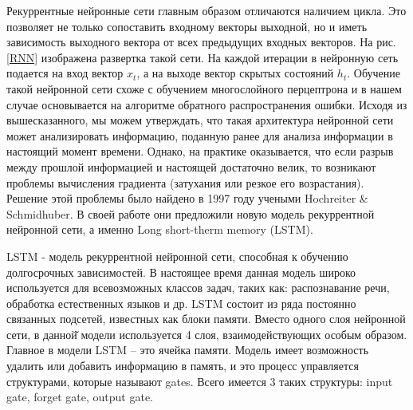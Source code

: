     Рекуррентные нейронные сети главным образом отличаются наличием цикла. Это позволяет не только сопоставить входному векторы выходной, но и иметь зависимость выходного вектора от всех предыдущих входных векторов. На рис. \ref{RNN} изображена развертка такой сети. На каждой итерации в нейронную сеть подается на вход вектор $x_{t}$, а на выходе вектор скрытых состояний $h_{t}$.
    Обучение такой нейронной сети схоже с обучением многослойного перцептрона и в нашем случае основывается на алгоритме обратного распространения ошибки. Исходя из вышесказанного, мы можем утверждать, что такая архитектура нейронной сети может анализировать информацию, поданную ранее для анализа информации в настоящий момент времени. Однако, на практике оказывается, что если разрыв между прошлой информацией и настоящей достаточно велик, то возникают проблемы вычисления градиента (затухания или резкое его возрастания). Решение этой проблемы было найдено в 1997 году учеными Hochreiter & Schmidhuber. В своей работе они предложили новую модель рекуррентной нейронной сети, а именно Long short-therm memory (LSTM).

    LSTM - модель рекуррентной нейронной сети, способная к обучению долгосрочных зависимостей. В настоящее время данная модель широко используется для всевозможных классов задач, таких как: распознавание речи, обработка естественных языков и др. LSTM состоит из ряда постоянно связанных подсетей, известных как блоки памяти. Вместо одного слоя нейронной сети, в данной̆ модели используется 4 слоя, взаимодействующих особым образом. Главное в модели LSTM – это ячейка памяти. Модель имеет возможность удалить или добавить информацию в память, и это процесс управляется структурами, которые называют gates. Всего имеется 3 таких структуры: input gate, forget gate, output gate.
    
